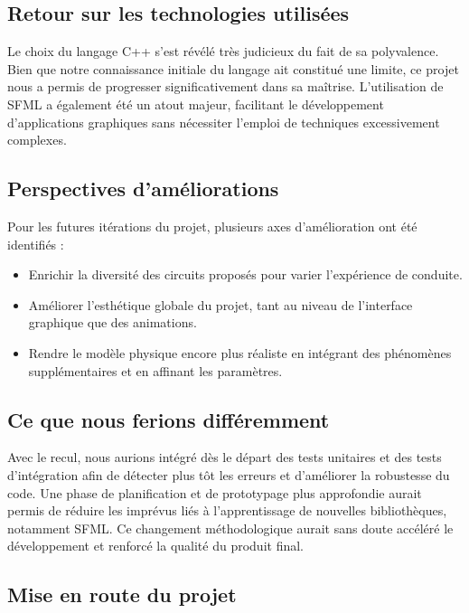 \subsection{Retour sur les technologies utilisées}\label{subsec:retour-sur-les-technologies-utilisees}
Le choix du langage C++ s'est révélé très judicieux du fait de sa polyvalence.
Bien que notre connaissance initiale du langage ait constitué une limite, ce projet nous a permis de progresser significativement dans sa maîtrise.
L'utilisation de SFML a également été un atout majeur, facilitant le développement d'applications graphiques sans nécessiter l'emploi de techniques excessivement complexes.

\subsection{Perspectives d'améliorations}\label{subsec:perspectives-d'ameliorations}
Pour les futures itérations du projet, plusieurs axes d'amélioration ont été identifiés :
\begin{itemize}
    \item Enrichir la diversité des circuits proposés pour varier l'expérience de conduite.
    \item Améliorer l'esthétique globale du projet, tant au niveau de l'interface graphique que des animations.
    \item Rendre le modèle physique encore plus réaliste en intégrant des phénomènes supplémentaires et en affinant les paramètres.
\end{itemize}

\subsection{Ce que nous ferions différemment}\label{subsec:ce-que-nous-ferions-differemment}
Avec le recul, nous aurions intégré dès le départ des tests unitaires et des tests d'intégration afin de détecter plus tôt les erreurs et d'améliorer la robustesse du code.
Une phase de planification et de prototypage plus approfondie aurait permis de réduire les imprévus liés à l'apprentissage de nouvelles bibliothèques, notamment SFML.
Ce changement méthodologique aurait sans doute accéléré le développement et renforcé la qualité du produit final.

\subsection{Mise en route du projet}\label{subsec:mise-en-route-du-projet}
